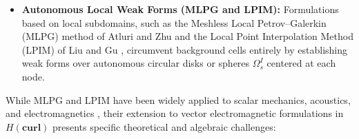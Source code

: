 \documentclass[preprint,12pt]{elsarticle}
\begin{document}
\begin{itemize}
    \item \textbf{Autonomous Local Weak Forms (MLPG and LPIM):} Formulations based on local subdomains, such as the Meshless Local Petrov--Galerkin (MLPG) method of Atluri and Zhu \cite{atluri1998new, atluri2002meshless} and the Local Point Interpolation Method (LPIM) of Liu and Gu \cite{liu2001local, liu2005introduction}, circumvent background cells entirely by establishing weak forms over autonomous circular disks or spheres $\Omega_s^I$ centered at each node.
\end{itemize}

While MLPG and LPIM have been widely applied to scalar mechanics, acoustics, and electromagnetics \cite{sladek2001local, atluri2002meshless, liu2001local,nicomedes2012meshless}, their extension to vector electromagnetic formulations in $H(\mathbf{curl})$ presents specific theoretical and algebraic challenges:
\end{document}
